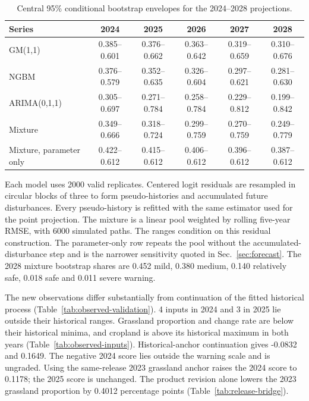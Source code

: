 \documentclass[preprint,11pt,authoryear]{elsarticle}
\begin{document}
\begin{table}[htbp]
\centering
\caption{Central 95\% conditional bootstrap envelopes for the 2024--2028 projections.}
\label{tab:forecastunc}
\footnotesize
\setlength{\tabcolsep}{3pt}
\begin{tabular}{lccccc}
\toprule
Series & 2024 & 2025 & 2026 & 2027 & 2028 \\
\midrule
GM(1,1) & 0.385--0.601 & 0.376--0.662 & 0.363--0.642 & 0.319--0.659 & 0.310--0.676 \\
NGBM & 0.376--0.579 & 0.352--0.635 & 0.326--0.604 & 0.297--0.621 & 0.281--0.630 \\
ARIMA(0,1,1) & 0.305--0.697 & 0.271--0.784 & 0.258--0.784 & 0.229--0.812 & 0.199--0.842 \\
Mixture & 0.349--0.666 & 0.318--0.724 & 0.299--0.759 & 0.270--0.759 & 0.249--0.779 \\
\midrule
Mixture, parameter only & 0.422--0.612 & 0.415--0.612 & 0.406--0.612 & 0.396--0.612 & 0.387--0.612 \\
\bottomrule
\end{tabular}

\vspace{2pt}
{\scriptsize Each model uses 2000 valid replicates. Centered logit residuals are resampled in circular blocks of three to form pseudo-histories and accumulated future disturbances. Every pseudo-history is refitted with the same estimator used for the point projection. The mixture is a linear pool weighted by rolling five-year RMSE, with 6000 simulated paths. The ranges condition on this residual construction. The parameter-only row repeats the pool without the accumulated-disturbance step and is the narrower sensitivity quoted in Sec.~\ref{sec:forecast}. The 2028 mixture bootstrap shares are 0.452 mild, 0.380 medium, 0.140 relatively safe, 0.018 safe and 0.011 severe warning.}
\end{table}

The new observations differ substantially from continuation of the fitted historical process (Table~\ref{tab:observed-validation}). 4 inputs in 2024 and 3 in 2025 lie outside their historical ranges. Grassland proportion and change rate are below their historical minima, and cropland is above its historical maximum in both years (Table~\ref{tab:observed-inputs}). Historical-anchor continuation gives -0.0832 and 0.1649. The negative 2024 score lies outside the warning scale and is ungraded. Using the same-release 2023 grassland anchor raises the 2024 score to 0.1178; the 2025 score is unchanged. The product revision alone lowers the 2023 grassland proportion by 0.4012 percentage points (Table~\ref{tab:release-bridge}).
\end{document}
